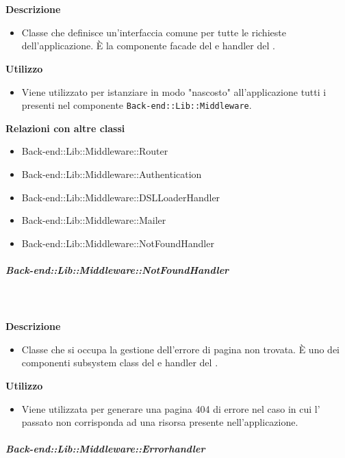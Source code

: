         \textbf{\\ \\ Descrizione} 
          \begin{itemize}
            \item[] Classe che definisce un'interfaccia comune per tutte le richieste dell'applicazione. È la componente facade del   e handler del  .
          \end{itemize}      
        \textbf{Utilizzo}  
          \begin{itemize}
            \item[] Viene utilizzato per istanziare in modo "nascosto" all'applicazione tutti i  presenti nel componente \texttt{Back-end::Lib::Middleware}.
          \end{itemize}
          \textbf{Relazioni con altre classi}
          \begin{itemize}
              \item{Back-end::Lib::Middleware::Router}
              \item{Back-end::Lib::Middleware::Authentication}
              \item{Back-end::Lib::Middleware::DSLLoaderHandler}
              \item{Back-end::Lib::Middleware::Mailer}
              \item{Back-end::Lib::Middleware::NotFoundHandler}
          \end{itemize}
      \subparagraph{Back-end::Lib::Middleware::NotFoundHandler}
        
        \textbf{\\ \\ Descrizione} 
          \begin{itemize}
            \item[] Classe che si occupa la gestione dell'errore di pagina non trovata. È uno dei componenti subsystem class del   e handler del  .
          \end{itemize}      
        \textbf{Utilizzo}  
          \begin{itemize}
            \item[] Viene utilizzata per generare una pagina 404 di errore nel caso in cui l' passato non corrisponda ad una risorsa presente nell'applicazione.
          \end{itemize}
      \subparagraph{Back-end::Lib::Middleware::Errorhandler}
        
